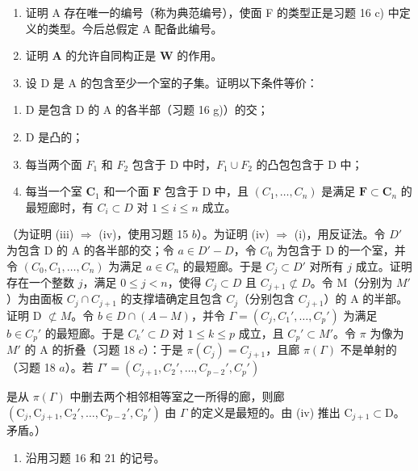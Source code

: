 \begin{enumerate}
\def\labelenumi{\alph{enumi})}
\item
  证明 A 存在唯一的编号（称为典范编号），使面 F 的类型正是习题 16 c) 中定义的类型。今后总假定 A 配备此编号。
\item
  证明 \(\mathbf{A}\) 的允许自同构正是 \(\mathbf{W}\) 的作用。
\item
  设 D 是 A 的包含至少一个室的子集。证明以下条件等价：
\end{enumerate}

\begin{enumerate}
\def\labelenumi{(\roman{enumi})}
\item
  D 是包含 D 的 A 的各半部（习题 16 g)）的交；
\item
  D 是凸的；
\item
  每当两个面 \(F_{1}\) 和 \(F_{2}\) 包含于 D 中时，\(F_{1} \cup F_{2}\) 的凸包包含于 D 中；
\item
  每当一个室 \(\mathbf{C}_1\) 和一个面 \(\mathbf{F}\) 包含于 \(\mathrm{D}\) 中，且 \((C_1, \ldots, C_n)\) 是满足 \(\mathbf{F} \subset \mathbf{C}_n\) 的最短廊时，有 \(C_i \subset D\) 对 \(1 \leqslant i \leqslant n\) 成立。
\end{enumerate}

（为证明 (iii) \(\Longrightarrow\) (iv)，使用习题 15 \(b\)）。为证明 (iv) \(\Longrightarrow\) (i)，用反证法。令 \(D'\) 为包含 D 的 A 的各半部的交；令 \(a \in D' - D\)，令 \(C_0\) 为包含于 D 的一个室，并令 \((C_0, C_1, \ldots, C_n)\) 为满足 \(a \in C_n\) 的最短廊。于是 \(C_j \subset D'\) 对所有 \(j\) 成立。证明存在一个整数 \(j\)，满足 \(0 \leqslant j < n\)，使得 \(C_j \subset D\) 且 \(C_{j+1} \not\subset D\)。令 M（分别为 \(M'\)）为由面板 \(C_j \cap C_{j+1}\) 的支撑墙确定且包含 \(C_j\)（分别包含 \(C_{j+1}\)）的 A 的半部。证明 D \(\not\subset M\)。令 \(b \in D \cap (A - M)\)，并令 \(\Gamma = (C_j, C_1', \ldots, C_p')\) 为满足 \(b \in C_p'\) 的最短廊。于是 \(C_k' \subset D\) 对 \(1 \leqslant k \leqslant p\) 成立，且 \(C_p' \subset M'\)。令 \(\pi\) 为像为 \(M'\) 的 A 的折叠（习题 18 \(c\)）：于是 \(\pi(C_j) = C_{j+1}\)，且廊 \(\pi(\Gamma)\) 不是单射的（习题 18 \(a\)）。若 \(\Gamma' = (C_{j+1}, C_2', \ldots, C_{p-2}', C_p')\)

是从 \(\pi(\Gamma)\) 中删去两个相邻相等室之一所得的廊，则廊 \((\mathrm{C}_{j}, \mathrm{C}_{j+1}, \mathrm{C}_{2}', \ldots, \mathrm{C}_{p-2}', \mathrm{C}_{p}')\) 由 \(\Gamma\) 的定义是最短的。由 (iv) 推出 \(\mathrm{C}_{j+1} \subset \mathrm{D}\)。矛盾。）

\begin{enumerate}
\def\labelenumi{\arabic{enumi})}
\setcounter{enumi}{21}
\tightlist
\item
  沿用习题 16 和 21 的记号。
\end{enumerate}

